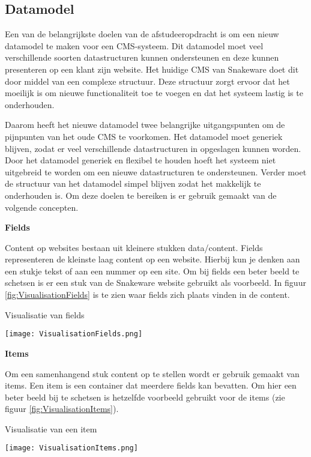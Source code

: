 \subsection{Datamodel}
\label{subsection:Datamodel}
Een van de belangrijkste doelen van de afstudeeropdracht is om een nieuw datamodel te maken voor een CMS-systeem.
Dit datamodel moet veel verschillende soorten datastructuren kunnen ondersteunen en deze kunnen presenteren op een klant zijn website.
Het huidige CMS van Snakeware doet dit door middel van een complexe structuur.
Deze structuur zorgt ervoor dat het moeilijk is om nieuwe functionaliteit toe te voegen en dat het systeem lastig is te onderhouden.

\whitespace
Daarom heeft het nieuwe datamodel twee belangrijke uitgangspunten om de pijnpunten van het oude CMS te voorkomen.
Het datamodel moet generiek blijven, zodat er veel verschillende datastructuren in opgeslagen kunnen worden.
Door het datamodel generiek en flexibel te houden hoeft het systeem niet uitgebreid te worden om een nieuwe datastructuren te ondersteunen.
Verder moet de structuur van het datamodel simpel blijven zodat het makkelijk te onderhouden is.
Om deze doelen te bereiken is er gebruik gemaakt van de volgende concepten.

\whitespace
\textbf{Fields}

\whitespace
Content op websites bestaan uit kleinere stukken data\slash content.
Fields representeren de kleinste laag content op een website. 
Hierbij kun je denken aan een stukje tekst of aan een nummer op een site.
Om bij fields een beter beeld te schetsen is er een stuk van de Snakeware website gebruikt als voorbeeld.
In figuur \ref{fig:VisualisationFields} is te zien  waar fields zich plaats vinden in de content.

\whitespace[2]
\begin{graphic}
    \captionsetup{type=figure}
    \caption{Visualisatie van fields}
    \texttt{[image: VisualisationFields.png]}
    \label{fig:VisualisationFields}
\end{graphic}

\whitespace
\textbf{Items}

\whitespace
Om een samenhangend stuk content op te stellen wordt er gebruik gemaakt van items.
Een item is een container dat meerdere fields kan bevatten.
Om hier een beter beeld bij te schetsen is hetzelfde voorbeeld gebruikt voor de items (zie figuur \ref{fig:VisualisationItems}).

\whitespace[2]
\begin{graphic}
    \captionsetup{type=figure}
    \caption{Visualisatie van een item}
    \texttt{[image: VisualisationItems.png]}
    \label{fig:VisualisationItems}
\end{graphic}

